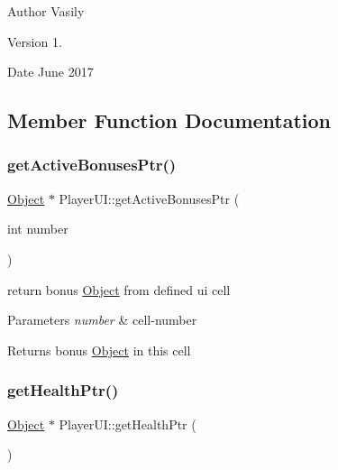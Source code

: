 \begin{DoxyAuthor}{Author}
Vasily 
\end{DoxyAuthor}
\begin{DoxyVersion}{Version}
1. 
\end{DoxyVersion}
\begin{DoxyDate}{Date}
June 2017 
\end{DoxyDate}


\subsection{Member Function Documentation}
\mbox{\label{class_player_u_i_aebce345a44f53a6ae0a6ac495aa6e17a}} 
\subsubsection{\texorpdfstring{get\+Active\+Bonuses\+Ptr()}{getActiveBonusesPtr()}}
{\footnotesize\ttfamily \hyperlink{class_object}{Object} $\ast$ Player\+U\+I\+::get\+Active\+Bonuses\+Ptr (\begin{DoxyParamCaption}\item[{int}]{number }\end{DoxyParamCaption})}



return bonus \hyperlink{class_object}{Object} from defined ui cell 


\begin{DoxyParams}{Parameters}
{\em number} & cell-\/number \\
\hline
\end{DoxyParams}
\begin{DoxyReturn}{Returns}
bonus \hyperlink{class_object}{Object} in this cell 
\end{DoxyReturn}
\mbox{\label{class_player_u_i_a013d923f183d6fb7f6e2a2cc2d1dd806}} 
\subsubsection{\texorpdfstring{get\+Health\+Ptr()}{getHealthPtr()}}
{\footnotesize\ttfamily \hyperlink{class_object}{Object} $\ast$ Player\+U\+I\+::get\+Health\+Ptr (\begin{DoxyParamCaption}{ }\end{DoxyParamCaption})}

